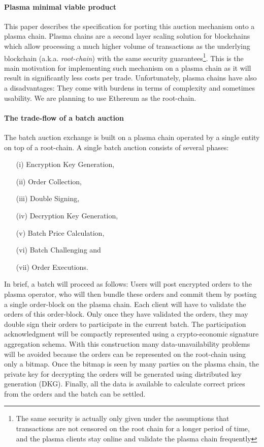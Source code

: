 \documentclass[11pt,parskip=full]{scrartcl}%
\begin{document}
\paragraph{Plasma minimal viable product}

This paper describes the specification for porting this auction mechanism onto a plasma chain. Plasma chains are a second layer scaling solution for blockchains which allow processing a much higher volume of transactions as the underlying blockchain (a.k.a. \emph{root-chain}) with the same security guarantees\footnote{The same security is actually only given under the assumptions that transactions are not censored on the root chain for a longer period of time, and the plasma clients stay online and validate the plasma chain frequently}. This is the main motivation for implementing such mechanism on a plasma chain as it will result in significantly less costs per trade. Unfortunately, plasma chains have also a disadvantages: They come with burdens in terms of complexity and sometimes usability. We are planning to use Ethereum as the root-chain. 

\paragraph{The trade-flow of a batch auction}  

The batch auction exchange is built on a plasma chain operated by a single entity on top of a root-chain. A single batch auction consists of several phases:
\begin{itemize}
\item[(i)] Encryption Key Generation, 
\item[(ii)] Order Collection, 
\item[(iii)] Double Signing, 
\item[(iv)] Decryption Key Generation,
\item[(v)] Batch Price Calculation,
\item[(vi)] Batch Challenging and 
\item[(vii)] Order Executions. 

\end{itemize}
In brief, a batch will proceed as follows: Users will post encrypted orders to the plasma operator, who will then bundle these orders and commit them by posting a single order-block on the plasma chain. Each client will have to validate the orders of this order-block. Only once they have validated the orders, they may double sign their orders to participate in the current batch. The participation acknowledgment will be compactly represented using a crypto-economic signature aggregation schema. With this construction many data-unavailability problems will be avoided because the orders can be represented on the root-chain using only a bitmap.
Once the bitmap is seen by many parties on the plasma chain, the private key for decrypting the orders will be generated using distributed key generation (DKG). Finally, all the data is available to calculate correct prices from the orders and the batch can be settled. 
\end{document}
